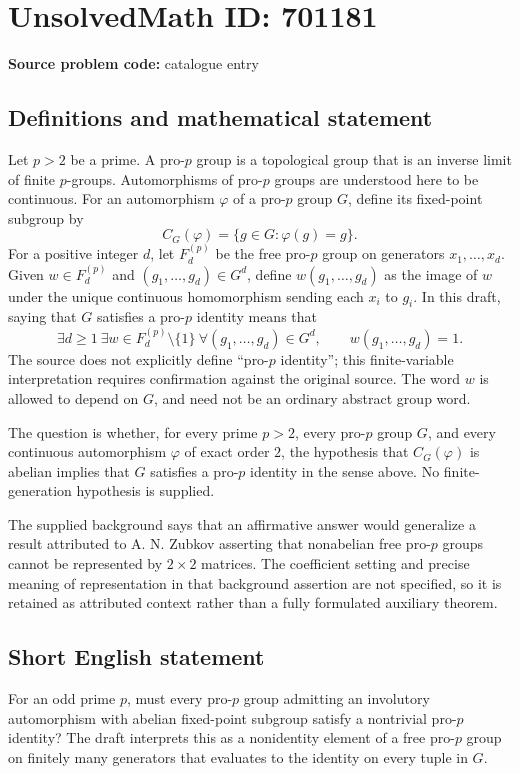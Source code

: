 \documentclass[11pt]{article}
\begin{document}
\section*{UnsolvedMath ID: 701181}
\textbf{Source problem code:} catalogue entry
\subsection{Definitions and mathematical statement}
Let \(p>2\) be a prime. A pro-\(p\) group is a topological group that is an inverse limit of finite \(p\)-groups. Automorphisms of pro-\(p\) groups are understood here to be continuous. For an automorphism \(\varphi\) of a pro-\(p\) group \(G\), define its fixed-point subgroup by
\[
C_G(\varphi)=\{g\in G:\varphi(g)=g\}.
\]
For a positive integer \(d\), let \(F_d^{(p)}\) be the free pro-\(p\) group on generators \(x_1,\ldots,x_d\). Given \(w\in F_d^{(p)}\) and \((g_1,\ldots,g_d)\in G^d\), define \(w(g_1,\ldots,g_d)\) as the image of \(w\) under the unique continuous homomorphism sending each \(x_i\) to \(g_i\). In this draft, saying that \(G\) satisfies a pro-\(p\) identity means that
\[
\exists d\geq 1\ \exists w\in F_d^{(p)}\setminus\{1\}\ \forall(g_1,\ldots,g_d)\in G^d,
\qquad w(g_1,\ldots,g_d)=1.
\]
The source does not explicitly define ``pro-\(p\) identity''; this finite-variable interpretation requires confirmation against the original source. The word \(w\) is allowed to depend on \(G\), and need not be an ordinary abstract group word.

The question is whether, for every prime \(p>2\), every pro-\(p\) group \(G\), and every continuous automorphism \(\varphi\) of exact order \(2\), the hypothesis that \(C_G(\varphi)\) is abelian implies that \(G\) satisfies a pro-\(p\) identity in the sense above. No finite-generation hypothesis is supplied.

The supplied background says that an affirmative answer would generalize a result attributed to A. N. Zubkov asserting that nonabelian free pro-\(p\) groups cannot be represented by \(2\times2\) matrices. The coefficient setting and precise meaning of representation in that background assertion are not specified, so it is retained as attributed context rather than a fully formulated auxiliary theorem.
\subsection{Short English statement}
For an odd prime \(p\), must every pro-\(p\) group admitting an involutory automorphism with abelian fixed-point subgroup satisfy a nontrivial pro-\(p\) identity? The draft interprets this as a nonidentity element of a free pro-\(p\) group on finitely many generators that evaluates to the identity on every tuple in \(G\).
\end{document}
